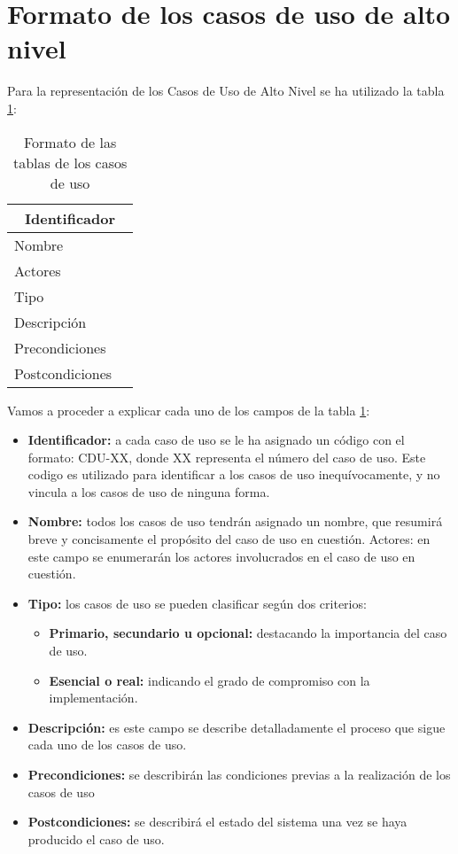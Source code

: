 \section{Formato de los casos de uso de alto nivel}

\par Para la representación de los Casos de Uso de Alto Nivel se ha utilizado la tabla \ref{tab:formatoCDU}:

\begin{table}[h]
\begin{center}
\begin{tabular}{p{} p{11cm}}
\multicolumn{2}{c}{\textbf{Identificador} } \\ \hline \hline
Nombre &  \\ \hline
Actores &  \\ \hline
Tipo & \\ \hline
Descripción &  \\ \hline
Precondiciones &  \\ \hline
Postcondiciones &  \\ \hline
\end{tabular}
\caption{Formato de las tablas de los casos de uso}
\label{tab:formatoCDU}
\end{center}
\end{table}

\par Vamos a proceder a explicar cada uno de los campos de la tabla \ref{tab:formatoCDU}:

\begin{itemize}[-]
\item \textbf{Identificador:} a cada caso de uso se le ha asignado un código con el formato: CDU-XX, donde XX representa el número del caso de uso. Este codigo es utilizado para identificar a los casos de uso inequívocamente, y no vincula a los casos de uso de ninguna forma.
\item \textbf{Nombre:} todos los casos de uso tendrán asignado un nombre, que resumirá breve y concisamente el propósito del caso de uso en cuestión.
Actores: en este campo se enumerarán los actores involucrados en el caso de uso en cuestión.
\item \textbf{Tipo:} los casos de uso se pueden clasificar según dos criterios:
\begin{itemize}[-]
\item \textbf{Primario, secundario u opcional:} destacando la importancia del caso de uso.
\item \textbf{Esencial o real:} indicando el grado de compromiso con la implementación.
\end{itemize}
\item \textbf{Descripción:} es este campo se describe detalladamente el proceso que sigue cada uno de los casos de uso.
\item \textbf{Precondiciones:} se describirán las condiciones previas a la realización de los casos de uso
\item \textbf{Postcondiciones:} se describirá el estado del sistema una vez se haya producido el caso de uso.
\end{itemize}
